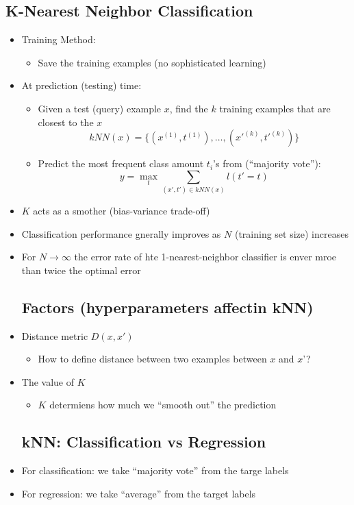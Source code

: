 \subsection{K-Nearest Neighbor Classification}
\begin{itemize}
	\item Training Method:
	\begin{itemize}
		\item Save the training examples (no sophisticated learning)
	\end{itemize}
	\item At prediction (testing) time:
	\begin{itemize}
		\item Given a test (query) example $x$, find the $k$ training examples that are closest to the $x$
			$$kNN(x)=\{ (x^{(1)}, t^{(1)}), \ldots, (x'^{(k)}, t'^{(k)})\}$$
		\item Predict the most frequent class amount $t_i$'s from (``majority vote''):
			$$y=\max_t \sum_{(x', t')\in kNN(x)} l(t'=t)$$
	\end{itemize}
	\item $K$ acts as a smother (bias-variance trade-off)
	\item Classification performance gnerally improves as $N$ (training set size) increases 
	\item For $N\to\infty$ the error rate of hte 1-nearest-neighbor classifier is enver mroe than twice the optimal error 
	\subsection{Factors (hyperparameters affectin kNN)}
	\item Distance metric $D(x, x')$
	\begin{itemize}
		\item How to define distance between two examples between $x$ and $x$'?
	\end{itemize}
	\item The value of $K$
	\begin{itemize}
		\item $K$ determiens how much we ``smooth out'' the prediction
	\end{itemize}
	\subsection{kNN: Classification vs Regression}
	\item For classification: we take ``majority vote'' from the targe labels
	\item For regression: we take ``average'' from the target labels
\end{itemize}